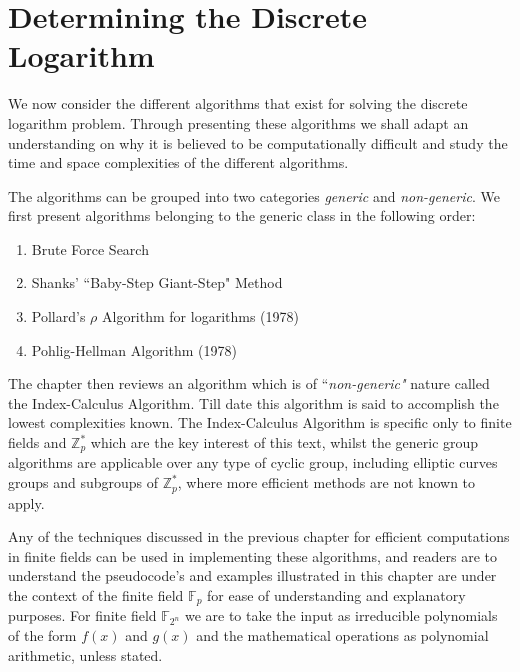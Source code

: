 \documentclass[iwp,first]{luthesis}
\begin{document}
\chapter{Determining the Discrete Logarithm}

We now consider the different algorithms that exist for solving the discrete logarithm problem. Through presenting these algorithms we shall adapt an understanding on why it is believed to be computationally difficult and study the time and space complexities of the different algorithms. 

The algorithms can be grouped into two categories \textit{generic} and \textit{non-generic}. We first present algorithms belonging to the generic class in the following order:

\begin{enumerate}

\item Brute Force Search 

\item Shanks' ``Baby-Step Giant-Step" Method

\item Pollard's $\rho$ Algorithm for logarithms (1978)

\item Pohlig-Hellman Algorithm (1978)

\end{enumerate}

The chapter then reviews an algorithm which is of ``\textit{non-generic"} nature called the Index-Calculus Algorithm. Till date this algorithm is said to accomplish the lowest complexities known. The Index-Calculus Algorithm is specific only to finite fields and $\mathbb{Z}^{*}_{p}$ which are the key interest of this text, whilst the generic group algorithms are applicable over any type of cyclic group, including elliptic curves groups and subgroups of $\mathbb{Z}^{*}_{p}$, where more efficient methods are not known to apply. 

Any of the techniques discussed in the previous chapter for efficient computations in finite fields can be used in implementing these algorithms, and readers are to understand the pseudocode's and examples illustrated in this chapter are under the context of the finite field $\mathbb{F}_p$ for ease of understanding and explanatory purposes. For finite field $\mathbb{F}_{2^n}$ we are to take the input as irreducible polynomials of the form $f(x)$ and $g(x)$ and the mathematical operations as polynomial arithmetic, unless stated.
\end{document}
